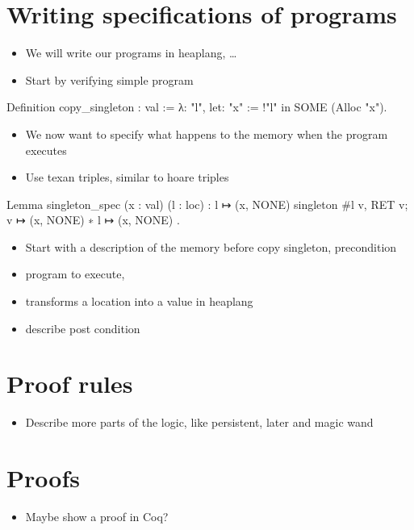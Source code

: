 \documentclass[thesis.tex]{subfiles}
\begin{document}
\section{Writing specifications of programs}
\begin{itemize}
  \item We will write our programs in heaplang, \ldots
  \item Start by verifying simple program
\end{itemize}
\begin{coqcode}
Definition copy_singleton : val :=
  λ: "l", let: "x" := !"l" in
          SOME (Alloc "x").
\end{coqcode}
\begin{itemize}
  \item We now want to specify what happens to the memory when the program executes
  \item Use texan triples, similar to hoare triples
\end{itemize}
\begin{coqcode}
Lemma singleton_spec (x : val) (l : loc) :
  {{{ l ↦ (x, NONE) }}}
    singleton #l
  {{{ v, RET v; v ↦ (x, NONE) ∗ l ↦ (x, NONE) }}}.
\end{coqcode}
\begin{itemize}
  \item Start with a description of the memory before copy singleton, precondition
  \item program to execute,
  \item {} transforms a location into a value in heaplang
  \item describe post condition
\end{itemize}

\section{Proof rules}
\begin{itemize}
  \item Describe more parts of the logic, like persistent, later and magic wand
\end{itemize}

\section{Proofs}
\begin{itemize}
  \item Maybe show a proof in Coq?
\end{itemize}
\end{document}
